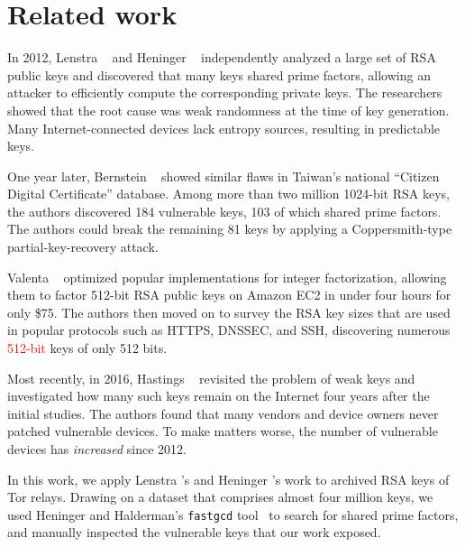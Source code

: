 \section{Related work}
In 2012, Lenstra \ea~\cite{Lenstra2012a} and Heninger \ea~\cite{Heninger2012a}
independently analyzed a large set of RSA public keys and discovered that many
keys shared prime factors, allowing an attacker to efficiently compute the
corresponding private keys.  The researchers showed that the root cause was weak
randomness at the time of key generation.  Many Internet-connected devices lack
entropy sources, resulting in predictable keys.

One year later, Bernstein \ea~\cite{Bernstein2013a} showed similar flaws in
Taiwan's national ``Citizen Digital Certificate'' database.  Among more than two
million 1024-bit RSA keys, the authors discovered 184 vulnerable keys, 103 of
which shared prime factors.  The authors could break the remaining 81 keys by
applying a Coppersmith-type partial-key-recovery attack.

Valenta \ea~\cite{Valenta2016a} optimized popular implementations for integer
factorization, allowing them to factor 512-bit RSA public keys on Amazon EC2 in
under four hours for only \$75.  The authors then moved on to survey the RSA key
sizes that are used in popular protocols such as HTTPS, DNSSEC, and SSH,
discovering numerous \textcolor{red}{512-bit} keys of only 512 bits.

Most recently, in 2016, Hastings \ea~\cite{Hastings2016a} revisited the problem
of weak keys and investigated how many such keys remain on the Internet four
years after the initial studies.  The authors found that many vendors and device
owners never patched vulnerable devices.  To make matters worse, the number of
vulnerable devices has \emph{increased} since 2012.

In this work, we apply Lenstra \ea's and Heninger \ea's work to archived RSA
keys of Tor relays.  Drawing on a dataset that comprises almost four million
keys, we used Heninger and Halderman's \texttt{fastgcd} tool~\cite{fastgcd} to
search for shared prime factors, and manually inspected the vulnerable keys that
our work exposed.
